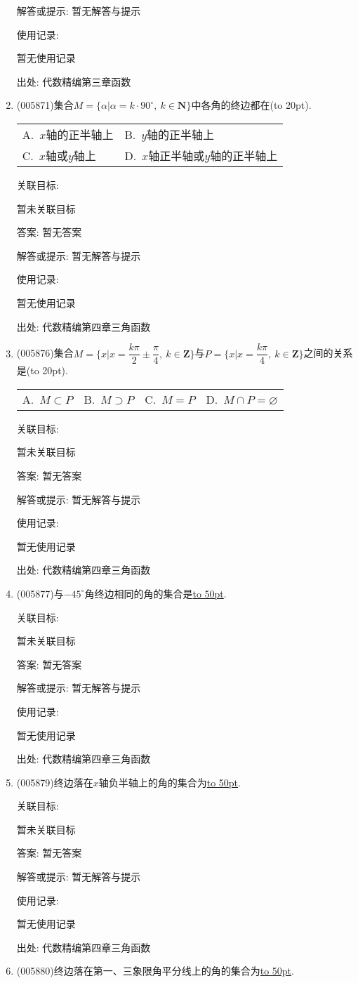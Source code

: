 \documentclass[10pt,a4paper]{article}
\newcommand{\blank}[1]{\underline{\hbox to #1pt{}}}
\newcommand{\bracket}[1]{(\hbox to #1pt{})}
\newcommand{\twoch}[4]{\par\begin{tabular}{p{.46\textwidth}p{.46\textwidth}}
A.~#1& B.~#2\\
C.~#3& D.~#4
\end{tabular}}
\newcommand{\fourch}[4]{\par\begin{tabular}{p{.23\textwidth}p{.23\textwidth}p{.23\textwidth}p{.23\textwidth}}
A.~#1 &B.~#2& C.~#3& D.~#4
\end{tabular}}
\begin{document}
\begin{enumerate}[1.]
解答或提示: 暂无解答与提示

使用记录:

暂无使用记录


出处: 代数精编第三章函数
\item { (005871)}集合$M=\{\alpha|\alpha =k\cdot 90^\circ , \ k\in \mathbf{N}\}$中各角的终边都在\bracket{20}.
\twoch{$x$轴的正半轴上}{$y$轴的正半轴上}{$x$轴或$y$轴上}{$x$轴正半轴或$y$轴的正半轴上}


关联目标:

暂未关联目标

答案: 暂无答案

解答或提示: 暂无解答与提示

使用记录:

暂无使用记录


出处: 代数精编第四章三角函数
\item { (005876)}集合$M=\{x|x=\dfrac{k\pi}2\pm \dfrac{\pi}4,\ k\in \mathbf{Z}\}$与$P=\{x|x=\dfrac{k\pi}4,\ k\in \mathbf{Z}\}$之间的关系是\bracket{20}.
\fourch{$M\subset P$}{$M\supset P$}{$M=P$}{$M\cap P=\varnothing$}


关联目标:

暂未关联目标

答案: 暂无答案

解答或提示: 暂无解答与提示

使用记录:

暂无使用记录


出处: 代数精编第四章三角函数
\item { (005877)}与$-45^\circ$角终边相同的角的集合是\blank{50}.


关联目标:

暂未关联目标

答案: 暂无答案

解答或提示: 暂无解答与提示

使用记录:

暂无使用记录


出处: 代数精编第四章三角函数
\item { (005879)}终边落在$x$轴负半轴上的角的集合为\blank{50}.


关联目标:

暂未关联目标

答案: 暂无答案

解答或提示: 暂无解答与提示

使用记录:

暂无使用记录


出处: 代数精编第四章三角函数
\item { (005880)}终边落在第一、三象限角平分线上的角的集合为\blank{50}.



\end{enumerate}
\end{document}
